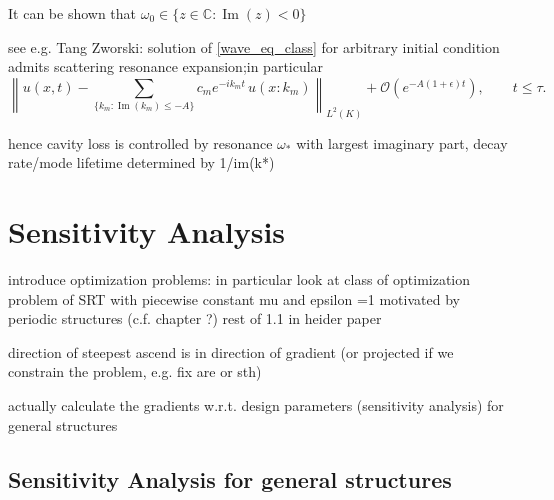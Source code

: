 %


%
It can be shown that $\omega_0 \in \{ z \in \mathbb{C} : \operatorname{Im}(z) <0\}$
%

see e.g. Tang Zworski: solution of \eqref{wave_eq_class} for arbitrary initial condition admits scattering resonance expansion;in particular
\[\left \lVert u(x,t) - \sum_{\{k_m: \operatorname{Im}(k_m) \leq -A \}} c_m e^{-i k_m t} \, u(x: k_m)  \right \rVert_{L^2(K)} + \mathcal{O}(e^{-A(1+\epsilon) t}), \qquad t \leq \tau.\]
 
hence cavity loss is controlled by resonance $\omega_*$ with largest imaginary part, decay rate/mode lifetime determined by 1/im(k*) 
\section{Sensitivity Analysis }

 introduce optimization problems:
 in particular look at class of optimization problem of SRT with piecewise constant mu and epsilon =1
 motivated by periodic structures (c.f. chapter ?) rest of 1.1 in heider paper
 
 
 direction of steepest ascend is in direction of gradient (or projected if we constrain the problem, e.g. fix are or sth)
 
 actually calculate the gradients w.r.t. design parameters (sensitivity analysis) for general structures\\
 
\newpage 
\subsection{Sensitivity Analysis for general structures}
